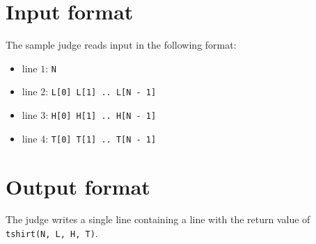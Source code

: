\section*{Input format}
The sample judge reads input in the following format:

\begin{itemize}
  \item line $1$: \texttt{N}
  \item line $2$: \texttt{L[0] L[1] .. L[N - 1]}
  \item line $3$: \texttt{H[0] H[1] .. H[N - 1]}
  \item line $4$: \texttt{T[0] T[1] .. T[N - 1]}
\end{itemize}

\section*{Output format}
The judge writes a single line containing a line with the return value of \texttt{tshirt(N, L, H, T)}.
